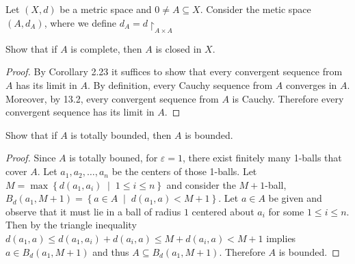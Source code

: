 \documentclass[12pt]{amsart}
\begin{document}
\begin{setup}
  Let $(X,d)$ be a metric space and $0 \not = A \subseteq X$.
  Consider the metic space $(A, d_A)$, where we define $d_A = d\restriction_{A \times A}$
  \begin{ex}
    Show that if $A$ is complete, then $A$ is closed in $X$.
    \begin{proof}
      By Corollary 2.23 it suffices to show that every convergent sequence from $A$ has its limit in $A$.
      By definition, every Cauchy sequence from $A$ converges in $A$.
      Moreover, by 13.2, every convergent sequence from $A$ is Cauchy.
      Therefore every convergent sequence has its limit in $A$.
    \end{proof}
  \end{ex}

  \begin{ex}
    Show that if $A$ is totally bounded, then $A$ is bounded.
    \begin{proof}
      Since $A$ is totally bouned, for $\varepsilon = 1$, there exist finitely many 1-balls that cover $A$.
      Let $a_1, a_2, \ldots, a_n$ be the centers of those 1-balls.
      Let $M = \max \left\{d(a_1, a_i) \;\middle\vert\; 1 \leq i \leq n\right\}$ and consider the $M+1$-ball, $B_d(a_1, M+1) = \left\{a \in A \;\middle\vert\; d(a_1, a) < M + 1\right\}$.
      Let $a \in A$ be given and observe that it must lie in a ball of radius $1$ centered about $a_i$ for some $1 \leq i \leq n$.
      Then by the triangle inequality $d(a_1, a) \leq d(a_1, a_i) + d(a_i, a) \leq M + d(a_i, a) < M + 1$ implies $a \in B_d(a_1, M+1)$ and thus $A \subseteq B_d(a_1, M+1)$.
      Therefore $A$ is bounded.
    \end{proof}
  \end{ex}
\end{setup}
\end{document}
